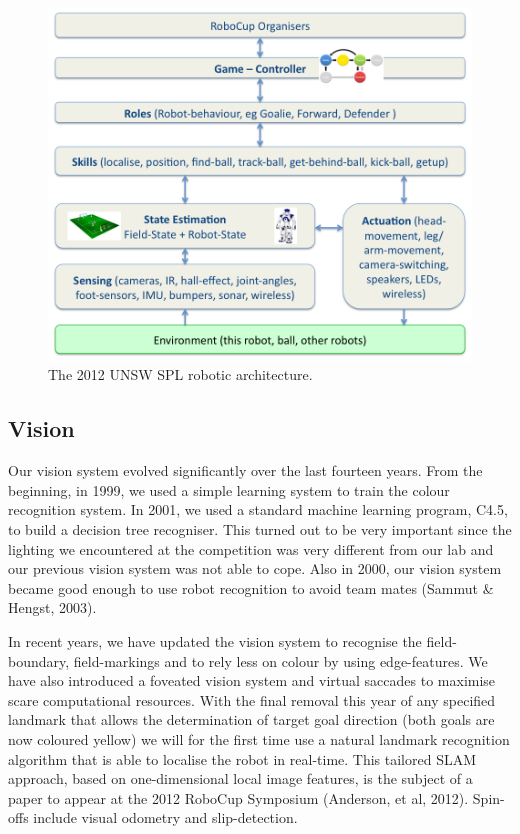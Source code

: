 \documentclass[runningheads,a4paper]{llncs}
\begin{document}
\begin{figure}[!htp]
\centering
\includegraphics[width=1.0\textwidth]{runswift2011architecture}
\caption{The 2012 UNSW SPL robotic architecture.} \label{figrunswift2011architecture}
\end{figure}

\subsection{Vision}
Our vision system evolved significantly over the last fourteen years. From the beginning, in 1999, we used a simple learning system to train the colour recognition system. In 2001, we used a standard machine learning program, C4.5, to build a decision tree recogniser. This turned out to be very important since the lighting we encountered at the competition was very different from our lab and our previous vision system was not able to cope. Also in 2000, our vision system became good enough to use robot recognition to avoid team mates (Sammut \& Hengst, 2003). 

In recent years, we have updated the vision system to recognise the field-boundary, field-markings and to rely less on colour by using edge-features. We have also introduced a foveated vision system and virtual saccades to maximise scare computational resources. With the final removal this year of any specified landmark that allows the determination of target goal direction (both goals are now coloured yellow) we will for the first time use a natural landmark recognition algorithm that is able to localise the robot in real-time. This tailored SLAM approach, based on one-dimensional local image features, is the subject of a paper to appear at the 2012 RoboCup Symposium (Anderson, et al, 2012). Spin-offs include visual odometry and slip-detection. 
\end{document}

